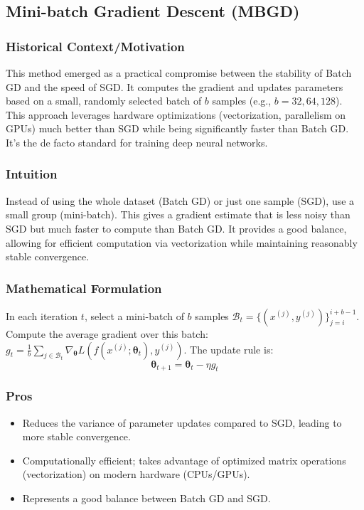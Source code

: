\documentclass{article}
\newcommand{\btheta}{\bm{\theta}}
\begin{document}
\subsection{Mini-batch Gradient Descent (MBGD)}

\subsubsection{Historical Context/Motivation}
This method emerged as a practical compromise between the stability of Batch GD and the speed of SGD. It computes the gradient and updates parameters based on a small, randomly selected batch of $b$ samples (e.g., $b=32, 64, 128$). This approach leverages hardware optimizations (vectorization, parallelism on GPUs) much better than SGD while being significantly faster than Batch GD. It's the de facto standard for training deep neural networks.

\subsubsection{Intuition}
Instead of using the whole dataset (Batch GD) or just one sample (SGD), use a small group (mini-batch). This gives a gradient estimate that is less noisy than SGD but much faster to compute than Batch GD. It provides a good balance, allowing for efficient computation via vectorization while maintaining reasonably stable convergence.

\subsubsection{Mathematical Formulation}
In each iteration $t$, select a mini-batch of $b$ samples $\mathcal{B}_t = \{(x^{(j)}, y^{(j)})\}_{j=i}^{i+b-1}$. Compute the average gradient over this batch: $g_t = \frac{1}{b} \sum_{j \in \mathcal{B}_t} \nabla_{\btheta} L(f(x^{(j)}; \btheta_t), y^{(j)})$. The update rule is:
\begin{equation}
    \btheta_{t+1} = \btheta_t - \eta g_t
\end{equation}

\subsubsection{Pros}
\begin{itemize}
    \item Reduces the variance of parameter updates compared to SGD, leading to more stable convergence.
    \item Computationally efficient; takes advantage of optimized matrix operations (vectorization) on modern hardware (CPUs/GPUs).
    \item Represents a good balance between Batch GD and SGD.
\end{itemize}
\end{document}
